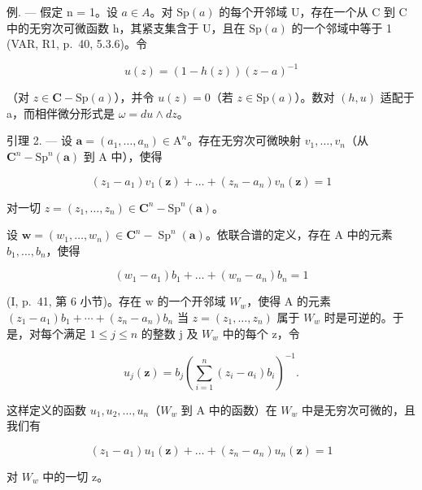 例. --- 假定 n = 1。设 \(a \in A\)。对 \(\mathrm{Sp}(a)\) 的每个开邻域 U，存在一个从 C 到 C 中的无穷次可微函数 h，其紧支集含于 U，且在 \(\mathrm{Sp}(a)\) 的一个邻域中等于 1 (VAR, R1, p.~40, 5.3.6)。令

\[
u (z) = (1 - h (z)) (z - a) ^ {- 1}
\]

（对 \(z \in \mathbf{C} - \mathrm{Sp}(a)\)），并令 \(u(z) = 0\)（若 \(z \in \mathrm{Sp}(a)\)）。数对 \((h, u)\) 适配于 a，而相伴微分形式是 \(\omega = du \wedge dz\)。

引理 2. --- 设 \(\boldsymbol{a} = (a_{1},\ldots ,a_{n})\in \mathrm{A}^{n}\)。存在无穷次可微映射 \(v_{1},\ldots ,v_{n}\)（从 \(\mathbf{C}^n -\mathrm{Sp}^n (\boldsymbol {a})\) 到 A 中），使得

\[
(z _ {1} - a _ {1}) v _ {1} (\boldsymbol {z}) + \dots + (z _ {n} - a _ {n}) v _ {n} (\boldsymbol {z}) = 1
\]

对一切 \(z = (z_{1}, \ldots, z_{n}) \in \mathbf{C}^{n} - \mathrm{Sp}^{n}(\boldsymbol{a})\)。

设 \(\boldsymbol{w} = (w_{1}, \ldots, w_{n}) \in \mathbf{C}^{n} - \operatorname{Sp}^{n}(\boldsymbol{a})\)。依联合谱的定义，存在 A 中的元素 \(b_{1}, \ldots, b_{n}\)，使得

\[
(w _ {1} - a _ {1}) b _ {1} + \dots + (w _ {n} - a _ {n}) b _ {n} = 1
\]

(I, p.~41, 第 6 小节)。存在 w 的一个开邻域 \(W_{w}\)，使得 A 的元素 \((z_{1}-a_{1})b_{1}+\cdots+(z_{n}-a_{n})b_{n}\) 当 \(z=(z_{1},\ldots,z_{n})\) 属于 \(W_{w}\) 时是可逆的。于是，对每个满足 \(1\leqslant j\leqslant n\) 的整数 j 及 \(W_{w}\) 中的每个 z，令

\[
u _ {j} (\boldsymbol {z}) = b _ {j} \left(\sum_ {i = 1} ^ {n} (z _ {i} - a _ {i}) b _ {i}\right) ^ {- 1}.
\]

这样定义的函数 \(u_{1}, u_{2}, \ldots, u_{n}\)（\(W_{w}\) 到 A 中的函数）在 \(W_{w}\) 中是无穷次可微的，且我们有

\[
(z _ {1} - a _ {1}) u _ {1} (\boldsymbol {z}) + \dots + (z _ {n} - a _ {n}) u _ {n} (\boldsymbol {z}) = 1
\]

对 \(W_{w}\) 中的一切 z。

